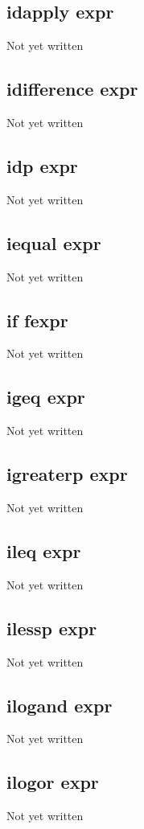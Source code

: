 \documentclass[a4paper,11pt]{article}
\begin{document}
\subsection{\ttfamily idapply expr}
Not yet written

\subsection{\ttfamily idifference expr}
Not yet written

\subsection{\ttfamily idp expr}
Not yet written

\subsection{\ttfamily iequal expr}
Not yet written

\subsection{\ttfamily if fexpr}
Not yet written

\subsection{\ttfamily igeq expr}
Not yet written

\subsection{\ttfamily igreaterp expr}
Not yet written

\subsection{\ttfamily ileq expr}
Not yet written

\subsection{\ttfamily ilessp expr}
Not yet written

\subsection{\ttfamily ilogand expr}
Not yet written

\subsection{\ttfamily ilogor expr}
Not yet written
\end{document}
